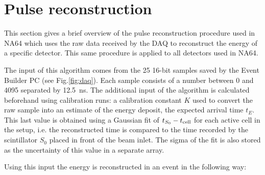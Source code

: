 \section{Pulse reconstruction}

This section gives a brief overview of the pulse reconstruction procedure used in NA64 which uses the raw data received by the DAQ to reconstruct the energy of a specific detector. This same procedure is applied to all detectors used in NA64.

The input of this algorithm comes from the 25 16-bit samples saved by the Event Builder PC (see Fig.\ref{fig:daq}). Each sample consists of a number between 0 and 4095 separated by \SI{12.5}{\nano\second}. The additional input of the algorithm is calculated beforehand using calibration runs: a calibration constant $K$ used to convert the raw sample into an estimate of the energy deposit, the expected arrival time $t_E$. This last value is obtained using a Gaussian fit of $t_{S_0} - t_{\rm{cell}}$ for each active cell in the setup, i.e. the reconstructed time is compared to the time recorded by the scintillator $S_0$ placed in front of the beam inlet. The sigma of the fit is also stored as the uncertainty of this value in a separate array.

Using this input the energy is reconstructed in an event in the following way:


